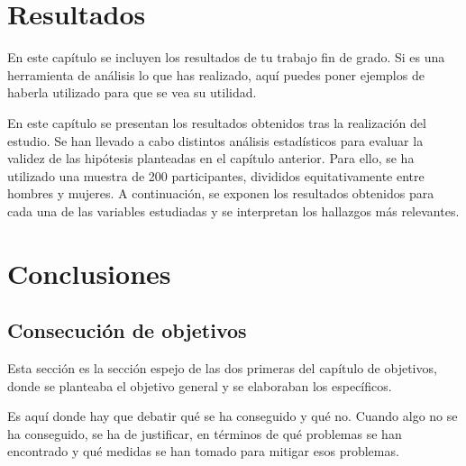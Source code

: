 \documentclass[a4paper, 12pt]{book}
\begin{document}

\cleardoublepage
\chapter{Resultados}
\label{chap:resultados}

En este capítulo se incluyen los resultados de tu trabajo fin de grado. Si es una herramienta de análisis lo que has realizado, aquí puedes poner ejemplos de haberla utilizado para que se vea su utilidad.


En este capítulo se presentan los resultados obtenidos tras la realización del estudio. 
Se han llevado a cabo distintos análisis estadísticos para evaluar la validez de las hipótesis planteadas en el capítulo anterior. 
Para ello, se ha utilizado una muestra de 200 participantes, divididos equitativamente entre hombres y mujeres. 
A continuación, se exponen los resultados obtenidos para cada una de las variables estudiadas y se interpretan los hallazgos más relevantes.


\cleardoublepage
\chapter{Conclusiones}
\label{chap:conclusiones}


\section{Consecución de objetivos}
\label{sec:consecucion-objetivos}

Esta sección es la sección espejo de las dos primeras del capítulo de objetivos, donde se planteaba el objetivo general y se elaboraban los específicos.

Es aquí donde hay que debatir qué se ha conseguido y qué no. 
Cuando algo no se ha conseguido, se ha de justificar, en términos de qué problemas se han encontrado y qué medidas se han tomado para mitigar esos problemas.
\end{document}
